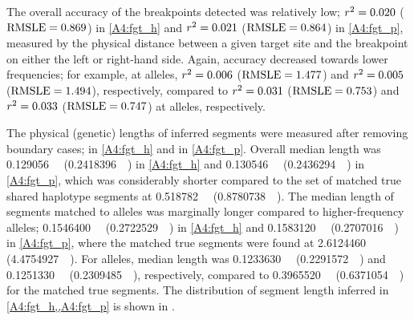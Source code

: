 The overall accuracy of the breakpoints detected was relatively low;
${r^2=\dec{0.02002049}}$ ($\rmsle=\dec{0.8689641}$) in \ref{A4:fgt_h} and
${r^2=\dec{0.02134879}}$ ($\rmsle=\dec{0.8640695}$) in \ref{A4:fgt_p}, measured by the physical distance between a given target site and the breakpoint on either the left or right-hand side.
Again, accuracy decreased towards lower frequencies; for example, at  alleles,
${r^2=\dec{0.005844105}}$ (${\rmsle=\dec{1.4768689}}$) and
${r^2=\dec{0.005439204}}$ (${\rmsle=\dec{1.4941836}}$), respectively, compared to
${r^2=\dec{0.030571264}}$ (${\rmsle=\dec{0.7530622}}$) and
${r^2=\dec{0.032509924}}$ (${\rmsle=\dec{0.7466905}}$) at  alleles, respectively.


%

%


The physical (genetic) lengths of inferred segments were measured after removing boundary cases;
 in \ref{A4:fgt_h} and
 in \ref{A4:fgt_p}.
Overall median length was
\SI{0.129056}{\mega\basepair} (\SI{0.2418396}{\centi\morgan}) in \ref{A4:fgt_h} and
\SI{0.130546}{\mega\basepair} (\SI{0.2436294}{\centi\morgan}) in \ref{A4:fgt_p}, which was considerably shorter compared to the set of matched true shared haplotype segments at
\SI{0.518782}{\mega\basepair} (\SI{0.8780738}{\centi\morgan}).
The median length of segments matched to  alleles was marginally longer compared to higher-frequency alleles;
\SI{0.1546400}{\mega\basepair} (\SI{0.2722529}{\centi\morgan}) in \ref{A4:fgt_h} and
\SI{0.1583120}{\mega\basepair} (\SI{0.2707016}{\centi\morgan}) in \ref{A4:fgt_p}, where the matched true segments were found at
\SI{2.6124460}{\mega\basepair} (\SI{4.4754927}{\centi\morgan}).
For  alleles, median length was
\SI{0.1233630}{\mega\basepair} (\SI{0.2291572}{\centi\morgan}) and
\SI{0.1251330}{\mega\basepair} (\SI{0.2309485}{\centi\morgan}), respectively, compared to
\SI{0.3965520}{\mega\basepair} (\SI{0.6371054}{\centi\morgan}) for the matched true segments.
The distribution of segment length inferred in \cref{A4:fgt_h,,A4:fgt_p} is shown in .



